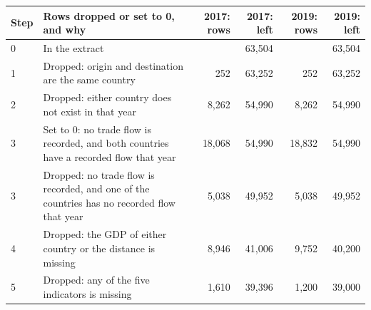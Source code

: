 \begin{tabular}{llrrrr}
\toprule
Step & Rows dropped or set to 0, and why & 2017: rows & 2017: left & 2019: rows & 2019: left \\
\midrule
0 & In the extract &  & 63,504 &  & 63,504 \\
1 & Dropped: origin and destination are the same country & 252 & 63,252 & 252 & 63,252 \\
2 & Dropped: either country does not exist in that year & 8,262 & 54,990 & 8,262 & 54,990 \\
3 & Set to 0: no trade flow is recorded, and both countries have a recorded flow that year & 18,068 & 54,990 & 18,832 & 54,990 \\
3 & Dropped: no trade flow is recorded, and one of the countries has no recorded flow that year & 5,038 & 49,952 & 5,038 & 49,952 \\
4 & Dropped: the GDP of either country or the distance is missing & 8,946 & 41,006 & 9,752 & 40,200 \\
5 & Dropped: any of the five indicators is missing & 1,610 & 39,396 & 1,200 & 39,000 \\
\bottomrule
\end{tabular}
